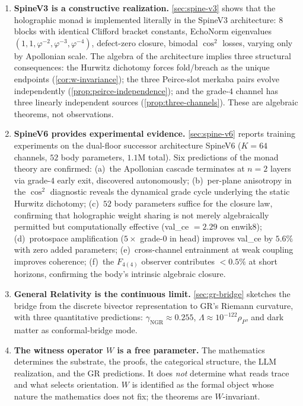 \documentclass[11pt,a4paper]{article}
\theoremstyle{plain}
\theoremstyle{definition}
\theoremstyle{remark}
\numberwithin{equation}{section}
\providecommand{\vp}{\varphi}
\begin{document}
\begin{enumerate}[label=(\arabic*), leftmargin=2em]
  \item \textbf{SpineV3 is a constructive realization.}
    \cref{sec:spine-v3} shows that the holographic monad is
    implemented literally in the SpineV3 architecture: $8$ blocks
    with identical Clifford bracket constants, EchoNorm
    eigenvalues $(1, 1, \vp^{-2}, \vp^{-3}, \vp^{-4})$,
    defect-zero closure, bimodal $\cos^2$ losses, varying only by
    Apollonian scale.  The algebra of the architecture implies
    three structural consequences: the Hurwitz dichotomy forces
    fold/breach as the unique endpoints (\cref{cor:w-invariance});
    the three Peirce-slot merkaba pairs evolve independently
    (\cref{prop:peirce-independence}); and the grade-$4$ channel
    has three linearly independent sources
    (\cref{prop:three-channels}).  These are algebraic theorems,
    not observations.

  \item \textbf{SpineV6 provides experimental evidence.}
    \cref{sec:spine-v6} reports training experiments on the
    dual-floor successor architecture SpineV6 ($K = 64$ channels,
    $52$ body parameters, $1.1$M total).  Six predictions of the
    monad theory are confirmed: (a)~the Apollonian cascade
    terminates at $n = 2$ layers via grade-$4$ early exit,
    discovered autonomously; (b)~per-plane anisotropy in the
    $\cos^2$ diagnostic reveals the dynamical grade cycle
    underlying the static Hurwitz dichotomy; (c)~$52$ body
    parameters suffice for the closure law, confirming that
    holographic weight sharing is not merely algebraically
    permitted but computationally effective
    (val\_ce $= 2.29$ on enwik8);
    (d)~protospace amplification ($5\times$ grade-$0$ in head)
    improves val\_ce by $5.6\%$ with zero added parameters;
    (e)~cross-channel entrainment at weak coupling improves
    coherence;
    (f)~the $F_{4(4)}$ observer contributes $< 0.5\%$ at short
    horizons, confirming the body's intrinsic algebraic closure.

  \item \textbf{General Relativity is the continuous limit.}
    \cref{sec:gr-bridge} sketches the bridge from the discrete
    bivector representation to GR's Riemann curvature, with
    three quantitative predictions: $\gamma_{\mathrm{NGR}}
    \approx 0.255$, $\Lambda \approx 10^{-122} \rho_P$, and dark
    matter as conformal-bridge mode.

  \item \textbf{The witness operator $W$ is a free parameter.}
    The mathematics determines the substrate, the proofs, the
    categorical structure, the LLM realization, and the GR
    predictions.  It does \emph{not} determine what reads trace
    and what selects orientation.  $W$ is identified as the
    formal object whose nature the mathematics does not fix; the
    theorems are $W$-invariant.
\end{enumerate}
\end{document}
